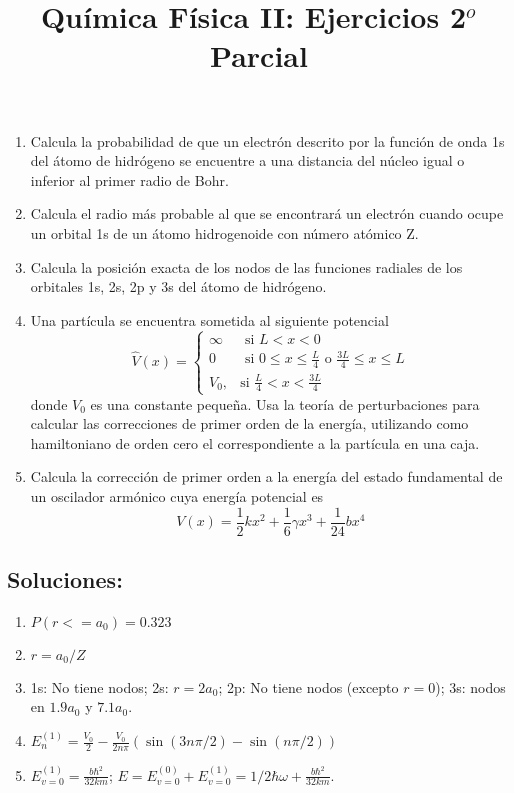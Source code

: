 \documentclass{tufte-handout}
\title[Química Física II: Ejercicios 2$^{o}$ Set]{
Química Física II: Ejercicios 2$^{o}$ Parcial}
\date{}  %
\begin{document}
\maketitle
\large
\begin{enumerate}
    \item Calcula la probabilidad de que un electrón descrito por la
    función de onda 1s del átomo de hidrógeno se encuentre a una distancia del 
    núcleo igual o inferior al primer radio de Bohr.
    
    \item Calcula el radio más probable al que se encontrará un
    electrón cuando ocupe un orbital 1s de un átomo 
    hidrogenoide con número atómico Z.
    
    \item Calcula la posición exacta de los nodos de las funciones
    radiales de los orbitales 1s, 2s, 2p y 3s del átomo de hidrógeno.
    
    \item Una partícula se encuentra sometida al siguiente potencial
    \begin{equation*}
\hat{V}(x)=
\begin{cases}
  \infty & \text{ si } L<x<0\\
  0  & \text{ si } 0\leq x\leq \frac{L}{4}\text{  o  }\frac{3L}{4}\leq x\leq L
\\
  V_0, & \text{si } \frac{L}{4}<x<\frac{3L}{4}
\end{cases}
\end{equation*}
    donde $V_0$ es una constante pequeña. Usa la teoría de perturbaciones
    para calcular las correcciones de primer orden de la energía, utilizando
    como hamiltoniano de orden cero el correspondiente a la partícula en 
    una caja.
    
    \item Calcula la corrección de primer orden a la energía del 
    estado fundamental de un oscilador armónico cuya energía potencial 
    es 
    \begin{equation*}
        V(x)=\frac{1}{2}kx^2 + \frac{1}{6}\gamma x^3  + \frac{1}{24}bx^4
    \end{equation*}
\end{enumerate}

\newpage
\subsection{\textbf{Soluciones:}}
\begin{enumerate}
\item $P(r<=a_0)=0.323$
\item $r=a_0/Z$
\item 1s: No tiene nodos; 2s: $r=2a_0$; 2p: No tiene nodos (excepto $r=0$); 3s: nodos en $1.9a_0$ y $7.1a_0$.
\item $E_n^{(1)}=\frac{V_0}{2}  - \frac{V_0}{2n\pi}(\sin(3n\pi/2) - \sin(n\pi/2))$
\item $E_{v=0}^{(1)}= \frac{b\hbar^2}{32km}$; $E=E_{v=0}^{(0)}+E_{v=0}^{(1)}= 1/2\hbar\omega +  \frac{b\hbar^2}{32km}$.
\end{enumerate}
\end{document}
